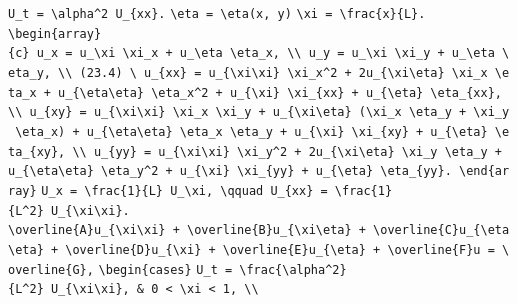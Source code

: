 \documentclass[
  ukrainian,
]{article}
\begin{document}
\texttt{U\_t\ =\ \textbackslash{}alpha\^{}2\ U\_\{xx\}.}
\texttt{\textbackslash{}eta\ =\ \textbackslash{}eta(x,\ y)}
\texttt{\textbackslash{}xi\ =\ \textbackslash{}frac\{x\}\{L\}.}
\texttt{\textbackslash{}begin\{array\}\{c\}\ u\_x\ =\ u\_\textbackslash{}xi\ \textbackslash{}xi\_x\ +\ u\_\textbackslash{}eta\ \textbackslash{}eta\_x,\ \textbackslash{}\textbackslash{}\ u\_y\ =\ u\_\textbackslash{}xi\ \textbackslash{}xi\_y\ +\ u\_\textbackslash{}eta\ \textbackslash{}eta\_y,\ \textbackslash{}\textbackslash{}\ (23.4)\ \textbackslash{}\ u\_\{xx\}\ =\ u\_\{\textbackslash{}xi\textbackslash{}xi\}\ \textbackslash{}xi\_x\^{}2\ +\ 2u\_\{\textbackslash{}xi\textbackslash{}eta\}\ \textbackslash{}xi\_x\ \textbackslash{}eta\_x\ +\ u\_\{\textbackslash{}eta\textbackslash{}eta\}\ \textbackslash{}eta\_x\^{}2\ +\ u\_\{\textbackslash{}xi\}\ \textbackslash{}xi\_\{xx\}\ +\ u\_\{\textbackslash{}eta\}\ \textbackslash{}eta\_\{xx\},\ \textbackslash{}\textbackslash{}\ u\_\{xy\}\ =\ u\_\{\textbackslash{}xi\textbackslash{}xi\}\ \textbackslash{}xi\_x\ \textbackslash{}xi\_y\ +\ u\_\{\textbackslash{}xi\textbackslash{}eta\}\ (\textbackslash{}xi\_x\ \textbackslash{}eta\_y\ +\ \textbackslash{}xi\_y\ \textbackslash{}eta\_x)\ +\ u\_\{\textbackslash{}eta\textbackslash{}eta\}\ \textbackslash{}eta\_x\ \textbackslash{}eta\_y\ +\ u\_\{\textbackslash{}xi\}\ \textbackslash{}xi\_\{xy\}\ +\ u\_\{\textbackslash{}eta\}\ \textbackslash{}eta\_\{xy\},\ \textbackslash{}\textbackslash{}\ u\_\{yy\}\ =\ u\_\{\textbackslash{}xi\textbackslash{}xi\}\ \textbackslash{}xi\_y\^{}2\ +\ 2u\_\{\textbackslash{}xi\textbackslash{}eta\}\ \textbackslash{}xi\_y\ \textbackslash{}eta\_y\ +\ u\_\{\textbackslash{}eta\textbackslash{}eta\}\ \textbackslash{}eta\_y\^{}2\ +\ u\_\{\textbackslash{}xi\}\ \textbackslash{}xi\_\{yy\}\ +\ u\_\{\textbackslash{}eta\}\ \textbackslash{}eta\_\{yy\}.\ \textbackslash{}end\{array\}}
\texttt{U\_x\ =\ \textbackslash{}frac\{1\}\{L\}\ U\_\textbackslash{}xi,\ \textbackslash{}qquad\ U\_\{xx\}\ =\ \textbackslash{}frac\{1\}\{L\^{}2\}\ U\_\{\textbackslash{}xi\textbackslash{}xi\}.}
\texttt{\textbackslash{}overline\{A\}u\_\{\textbackslash{}xi\textbackslash{}xi\}\ +\ \textbackslash{}overline\{B\}u\_\{\textbackslash{}xi\textbackslash{}eta\}\ +\ \textbackslash{}overline\{C\}u\_\{\textbackslash{}eta\textbackslash{}eta\}\ +\ \textbackslash{}overline\{D\}u\_\{\textbackslash{}xi\}\ +\ \textbackslash{}overline\{E\}u\_\{\textbackslash{}eta\}\ +\ \textbackslash{}overline\{F\}u\ =\ \textbackslash{}overline\{G\},}
\texttt{\textbackslash{}begin\{cases\}}
\texttt{U\_t\ =\ \textbackslash{}frac\{\textbackslash{}alpha\^{}2\}\{L\^{}2\}\ U\_\{\textbackslash{}xi\textbackslash{}xi\},\ \&\ 0\ \textless{}\ \textbackslash{}xi\ \textless{}\ 1,\ \textbackslash{}\textbackslash{}}
\end{document}
